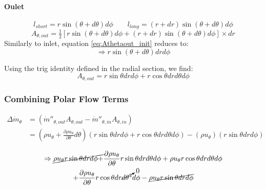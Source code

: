 \documentclass[12pt, letterpaper, twoside]{article}
\begin{document}
        \paragraph{Oulet}
            \begin{equation*}
                l_{short} = r\sin\left(\theta + d\theta\right) d\phi \qquad
                l_{long} = (r + dr)\sin\left(\theta + d\theta\right) d\phi 
            \end{equation*}
            \begin{equation}\label{eq:Athetaout_init}
                A_{\theta,out} = \tfrac{1}{2} \left[r\sin\left(\theta + d\theta\right) d\phi +  (r + dr)\sin\left(\theta + d\theta\right) d\phi \right] \times dr
            \end{equation}
            Similarly to inlet, equation \ref{eq:Athetaout_init} reduces to:
            \begin{equation*}
                \Rightarrow
                r\sin\left(\theta + d\theta \right) dr d\phi
            \end{equation*}
            
            Using the trig identity defined in the radial section, we find:
            \begin{equation}\label{eq:Athetaout_final}
                A_{\theta,out} = r\sin\theta dr d\phi + r\cos\theta dr d\theta d\phi
            \end{equation}

        \subsubsection{Combining Polar Flow Terms}
            \begin{equation*}
            \begin{split}
                \Delta\dot{m}_{\theta} & = (\dot{m}''_{\theta,out} A_{\theta,out} - \dot{m}''_{\theta,in} A_{\theta,in}) \\
                & = \left( \rho u_{\theta}  + \frac{\partial \rho u_{\theta}}{\partial \theta} d\theta \right) 
               \left(r\sin\theta dr d\phi + r\cos\theta dr d\theta d\phi\right) - 
               \left(\rho u_{\theta}\right) \left(r\sin\theta dr d\phi\right)
            \end{split}
            \end{equation*}

            \begin{multline*}
                \Rightarrow
                \cancel{\rho u_{\theta}r\sin\theta dr d\phi +} 
                \frac{\partial\rho u_{\theta}}{\partial\theta} r\sin\theta dr d\theta d\phi +
                \rho u_{\theta} r\cos\theta dr d\theta d\phi \\ + 
                \frac{\partial\rho u_{\theta}}{\partial\theta} r\cos\theta dr \cancelto{0}{d\theta^2} d\phi -
                \cancel{\rho u_{\theta}r\sin\theta dr d\phi}
            \end{multline*}
\end{document}
